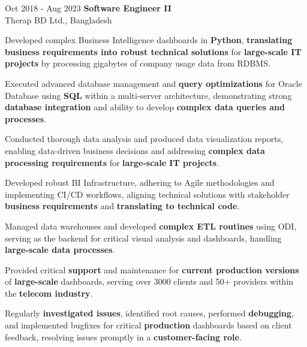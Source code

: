 \vspace{0.2 cm}

        \begin{twocolentry}{
            Oct 2018 - Aug 2023
        }
            \textbf{Software Engineer II} \\ Therap BD Ltd., Bangladesh\end{twocolentry}

        \vspace{0.10 cm}
        \begin{onecolentry}
            \begin{highlights}
                \item Developed complex Business Intelligence dashboards in \textbf{Python}, \textbf{translating business requirements into robust technical solutions} for \textbf{large-scale IT projects} by processing gigabytes of company usage data from RDBMS.
                \item Executed advanced database management and \textbf{query optimizations} for Oracle Database using \textbf{SQL} within a multi-server architecture, demonstrating strong \textbf{database integration} and ability to develop \textbf{complex data queries and processes}.
                \item Conducted thorough data analysis and produced data visualization reports, enabling data-driven business decisions and addressing \textbf{complex data processing requirements} for \textbf{large-scale IT projects}.
                \item Developed robust BI Infrastructure, adhering to Agile methodologies and implementing CI/CD workflows, aligning technical solutions with stakeholder \textbf{business requirements} and \textbf{translating to technical code}.
                \item Managed data warehouses and developed \textbf{complex ETL routines} using ODI, serving as the backend for critical visual analysis and dashboards, handling \textbf{large-scale data processes}.
                \item Provided critical \textbf{support} and maintenance for \textbf{current production versions} of \textbf{large-scale} dashboards, serving over 3000 clients and 50+ providers within the \textbf{telecom industry}.
                \item Regularly \textbf{investigated issues}, identified root causes, performed \textbf{debugging}, and implemented bugfixes for critical \textbf{production} dashboards based on client feedback, resolving issues promptly in a \textbf{customer-facing role}.

\end{highlights}
\end{onecolentry}
